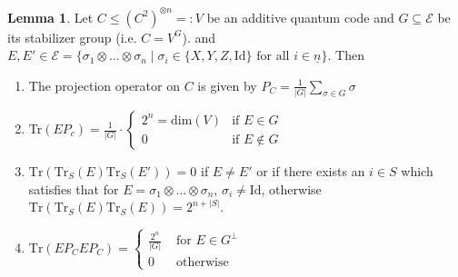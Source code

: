 \documentclass{article}
\def\fa{\text{ for all }}
\def\Tr{\text{Tr}}
\def\Id{\text{Id}}
\theoremstyle{definition}
\newtheorem{lem}[Satz]{Lemma}
\begin{document}
\begin{lem}\label{lemmaenums}
Let $C \leq (C^2)^{\otimes n} =: V$ be an additive quantum code and $G \subseteq \mathcal{E}$ be its stabilizer group (i.e. $C = V^G$). and $E,E' \in \mathcal{E} = \{ \sigma_1 \otimes \ldots \otimes \sigma_n \mid \sigma_i \in \{X,Y,Z,\Id \} \fa i \in \underline{n} \}$. Then
\begin{enumerate}
\item The projection operator on $C$ is given by $P_C = \frac{1}{|G|} \sum_{\sigma \in G} \sigma$
\item Tr$(EP_c) = \frac{1}{|G|} \cdot \left\{ \begin{array}{lr} 2^n = \text{dim}(V) & \text{if } E \in G \\ 0 & \text{if } E \notin G \end{array} \right.$
\item $\Tr(\Tr_S(E)\Tr_S(E')) = 0$ if $E \neq E'$ or if there exists an $i \in S$ which satisfies that for $E = \sigma_1 \otimes \ldots \otimes \sigma_n$, $\sigma_i \neq \Id$, otherwise $\Tr(\Tr_S(E)\Tr_S(E)) = 2^{n+|S|}$.
\item $\Tr( E P_C E P_C) = \left\{ \begin{array}{lr} \frac{2^n}{|G|} & \text{ for } E \in G^\perp \\ 0 & \text{ otherwise} \end{array} \right.$ 
\end{enumerate}


\end{lem}
\end{document}
